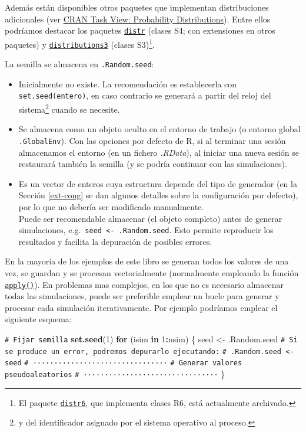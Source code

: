 \documentclass[
  spanish,
  10pt,
]{book}
\newenvironment{Shaded}{\begin{snugshade}}{\end{snugshade}}
\newcommand{\CommentTok}[1]{\textcolor[rgb]{0.56,0.35,0.01}{\textit{#1}}}
\newcommand{\ControlFlowTok}[1]{\textcolor[rgb]{0.13,0.29,0.53}{\textbf{#1}}}
\newcommand{\DecValTok}[1]{\textcolor[rgb]{0.00,0.00,0.81}{#1}}
\newcommand{\FunctionTok}[1]{\textcolor[rgb]{0.13,0.29,0.53}{\textbf{#1}}}
\newcommand{\NormalTok}[1]{#1}
\newcommand{\OtherTok}[1]{\textcolor[rgb]{0.56,0.35,0.01}{#1}}
\newcommand{\SpecialCharTok}[1]{\textcolor[rgb]{0.81,0.36,0.00}{\textbf{#1}}}
\theoremstyle{break}
\theoremstyle{nonumberplain}
\renewcommand{\CommentTok}[1]{\textcolor[rgb]{0.41,0.41,0.41}{\texttt{#1}}}
\let\oldfootnote\footnote
\renewcommand\footnote[1]{\oldfootnote{\hspace{2mm}#1}}
\begin{document}
Además están disponibles otros paquetes que implementan distribuciones adicionales (ver \href{https://cran.r-project.org/view=Distributions}{CRAN Task View: Probability Distributions}).
Entre ellos podríamos destacar los paquetes \href{http://distr.r-forge.r-project.org}{\texttt{distr}} (clases S4; con extensiones en otros paquetes) y \href{https://alexpghayes.github.io/distributions3/}{\texttt{distributions3}} (clases S3)\footnote{El paquete \href{https://cran.r-project.org/package=distr6}{\texttt{distr6}}, que implementa clases R6, está actualmente archivado.}.

La semilla se almacena en \texttt{.Random.seed}:

\begin{itemize}
\item
  Inicialmente no existe.
  La recomendación es establecerla con \texttt{set.seed(entero)}, en caso contrario se generará a partir del reloj del sistema\footnote{y del identificador asignado por el sistema operativo al proceso.} cuando se necesite.
\item
  Se almacena como un objeto oculto en el entorno de trabajo (o entorno global \texttt{.GlobalEnv}). Con las opciones por defecto de R, si al terminar una sesión almacenamos el entorno (en un fichero \emph{.RData}), al iniciar una nueva sesión se restaurará también la semilla (y se podría continuar con las simulaciones).
\item
  Es un vector de enteros cuya estructura depende del tipo de generador (en la Sección \ref{ext-cong} se dan algunos detalles sobre la configuración por defecto), por lo que no debería ser modificado manualmente.\\
  Puede ser recomendable almacenar (el objeto completo) antes de generar simulaciones, e.g.~\texttt{seed\ \textless{}-\ .Random.seed}. Esto permite reproducir los resultados y facilita la depuración de posibles errores.
\end{itemize}

En la mayoría de los ejemplos de este libro se generan todos los valores de una vez,
se guardan y se procesan vectorialmente (normalmente empleando la función \href{https://rdrr.io/r/base/apply.html}{\texttt{apply()}}).
En problemas mas complejos, en los que no es necesario almacenar todas las simulaciones,
puede ser preferible emplear un bucle para generar y procesar cada simulación iterativamente.
Por ejemplo podríamos emplear el siguiente esquema:

\begin{Shaded}
\begin{Highlighting}[]
\CommentTok{\# Fijar semilla}
\FunctionTok{set.seed}\NormalTok{(}\DecValTok{1}\NormalTok{)}
\ControlFlowTok{for}\NormalTok{ (isim }\ControlFlowTok{in} \DecValTok{1}\SpecialCharTok{:}\NormalTok{nsim) \{}
\NormalTok{  seed }\OtherTok{\textless{}{-}}\NormalTok{ .Random.seed}
  \CommentTok{\# Si se produce un error, podremos depurarlo ejecutando:}
  \CommentTok{\#  .Random.seed \textless{}{-} seed}
  \CommentTok{\# ································}
  \CommentTok{\# Generar valores pseudoaleatorios}
  \CommentTok{\# ································}
\NormalTok{\}}
\end{Highlighting}
\end{Shaded}
\end{document}
